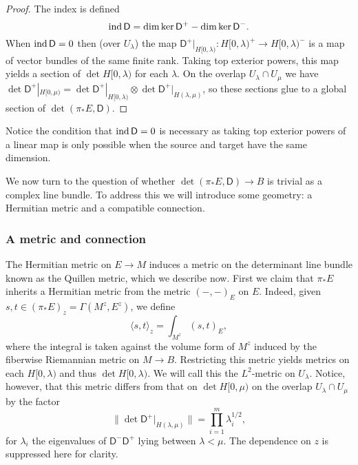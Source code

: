 \documentclass{amsart}
\renewcommand\d{\mathsf{D}}
\begin{document}
\begin{proof}
    The index is defined 
    \begin{equation*}
        \ind \d=\dim\ker\d^+-\dim\ker\d^-.
    \end{equation*}
    When $\ind\d=0$ then (over $U_\lambda$) the map $\d^+|_{H[0,\lambda)}:H[0,\lambda)^+\to H[0,\lambda)^-$
    is a map of vector bundles of the same finite rank. Taking top exterior powers, this map yields
    a section of $\det H[0,\lambda)$ for each $\lambda$. On the overlap $U_\lambda\cap U_\mu$ we have
    $\det\d^+|_{H[0,\mu)}=\det\d^+|_{H[0,\lambda)}\otimes\det\d^+|_{H(\lambda,\mu)}$, so these sections
    glue to a global section of $\det(\pi_*E,\d)$.
\end{proof}
Notice the condition that $\ind\d=0$ is necessary as taking top exterior powers of a linear map is only
possible when the source and target have the same dimension.

We now turn to the question of whether $\det(\pi_*E,\d)\to B$ is trivial as a complex line bundle.
To address this we will introduce some geometry: a Hermitian metric and a compatible connection.

\subsubsection{A metric and connection}
The Hermitian metric on $E\to M$ induces a metric on the determinant line bundle known as the
Quillen metric, which we describe now. First we claim that $\pi_*E$ inherits a Hermitian metric
from the metric $(-,-)_E$ on $E$. Indeed, given $s,t\in(\pi_*E)_z=\Gamma(M^z, E^z)$, we define
\begin{equation*}
    \langle s,t\rangle_z = \int_{M^z} (s,t)_E,
\end{equation*}
where the integral is taken against the volume form of $M^z$ induced by the fiberwise Riemannian
metric on $M\to B$. Restricting this metric yields metrics on each $H[0,\lambda)$ and thus
$\det H[0,\lambda)$. We will call this the $L^2$-metric on $U_\lambda$.
Notice, however, that this metric differs from that on $\det H[0,\mu)$
on the overlap $U_\lambda\cap U_\mu$ by the factor
\begin{equation*}
    \lVert \det \d^+|_{H(\lambda,\mu)}\rVert = \prod_{i=1}^m \lambda_i^{1/2},
\end{equation*}
for $\lambda_i$ the eigenvalues of $\d^-\d^+$ lying between $\lambda<\mu$. The dependence on
$z$ is suppressed here for clarity.
\end{document}

